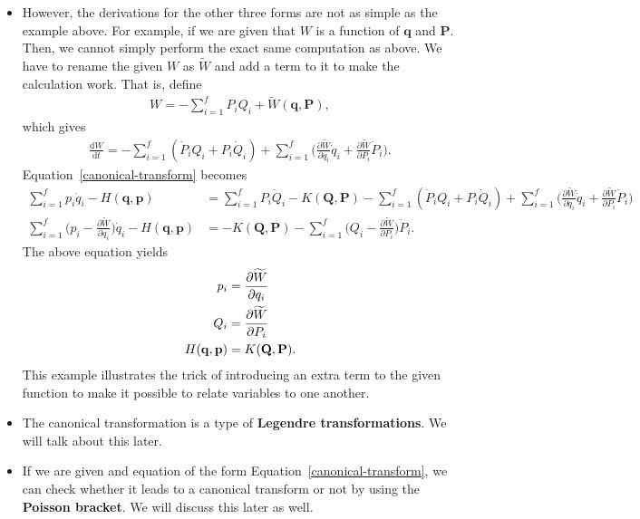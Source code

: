 \documentclass[10pt]{article}
\newcommand{\dee}{\mathrm{d}}
\newcommand{\ve}[1]{\mathbf{#1}}
\begin{document}
\begin{itemize}
    \item However, the derivations for the other three forms are not as simple as the example above. For example, if we are given that $W$ is a function of $\ve{q}$ and $\ve{P}$. Then, we cannot simply perform the exact same computation as above. We have to rename the given $W$ as $\widetilde{W}$ and add a term to it to make the calculation work. That is, define
    \begin{align*}
      W = -\sum_{i=1}^f P_i Q_i + \widetilde{W}(\ve{q},\ve{P}),
    \end{align*}
    which gives
    \begin{align*}
      \frac{\dee W}{\dee t}
      = -\sum_{i=1}^f (\dot{P}_i Q_i + P_i \dot{Q}_i)
      + \sum_{i=1}^f \bigg( \frac{\partial \widetilde{W}}{\partial q_i} \dot{q}_i + \frac{\partial \widetilde{W}}{\partial P_i} \dot{P}_i \bigg). 
    \end{align*}
    Equation~\ref{canonical-transform} becomes
    \begin{align*}
      \sum_{i=1}^f p_i \dot{q}_i - H(\ve{q},\ve{p}) 
      &= \sum_{i=1}^f P_i \dot{Q}_i - K(\ve{Q}, \ve{P})
      -\sum_{i=1}^f (\dot{P}_i Q_i + P_i \dot{Q}_i)
      + \sum_{i=1}^f \bigg( \frac{\partial \widetilde{W}}{\partial q_i} \dot{q}_i + \frac{\partial \widetilde{W}}{\partial P_i} \dot{P}_i \bigg) \\
      \sum_{i=1}^f \bigg( p_i - \frac{\partial \widetilde{W}}{\partial q_i} \bigg) \dot{q}_i - H(\ve{q},\ve{p}) 
      &= - K(\ve{Q}, \ve{P})
      -\sum_{i=1}^f \bigg( Q_i - \frac{\partial \widetilde{W}}{\partial P_i} \bigg) \dot{P}_i.
    \end{align*}
    The above equation yields
    \begin{align}
      p_i &= \frac{\partial \widetilde{W}}{\partial q_i} \label{qP-p} \\
      Q_i &= \frac{\partial \widetilde{W}}{\partial P_i} \label{qP-Q} \\
      H(\ve{q},\ve{p}) &= K(\ve{Q}, \ve{P}) \notag.
    \end{align}
    This example illustrates the trick of introducing an extra term to the given function to make it possible to relate variables to one another.

    \item The canonical transformation is a type of {\bf Legendre transformations}. We will talk about this later.

    \item If we are given and equation of the form Equation~\ref{canonical-transform}, we can check whether it leads to a canonical transform or not by using the {\bf Poisson bracket}. We will discuss this later as well.    
  \end{itemize}
\end{document}
